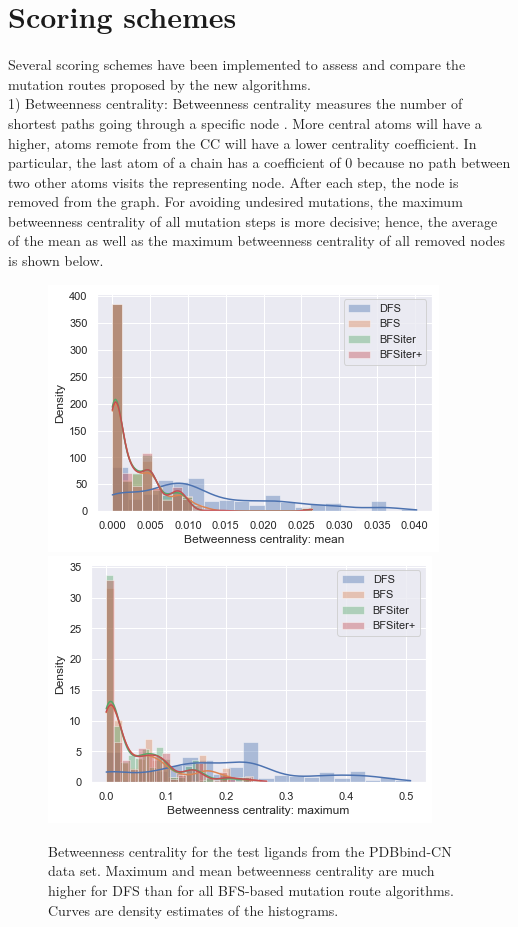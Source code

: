 \section{Scoring schemes}

Several scoring schemes have been implemented to assess and compare
the mutation routes proposed by the new algorithms.\\
1) Betweenness centrality: Betweenness centrality measures the number
of shortest paths going through a specific node \cite{Newman.2010}. More central atoms
will have a higher, atoms remote from
the CC will have a lower centrality coefficient. In particular, the last atom of a chain
has a coefficient of 0 because no path between two other atoms visits
the representing node. After each step, the node is removed from
the graph.
For avoiding undesired mutations, the maximum betweenness centrality
of all mutation steps is more decisive; hence, the average of the mean
as well as the maximum betweenness centrality of all removed nodes
is shown below.

\begin{figure}[H]
	
	\includegraphics[scale=0.8]{betweenness_mean_all}\includegraphics[scale=0.8]{betweenness_max_all}\caption{Betweenness centrality for the test ligands from the PDBbind-CN data set. Maximum and mean betweenness centrality are much higher for DFS than for all BFS-based mutation route algorithms. Curves are density estimates of the histograms.}
	
\end{figure}

